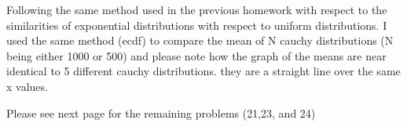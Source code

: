 \documentclass{article}\usepackage[]{graphicx}\usepackage[]{color}
\begin{document}
Following the same method used in the previous homework with respect to the similarities of exponential distributions with respect to uniform distributions. I used the same method (ecdf) to compare the mean of N cauchy distributions (N being either 1000 or 500) and please note how the graph of the means are near identical to 5 different cauchy distributions. they are a straight line over the same x values.


Please see next page for the remaining problems (21,23, and 24)
\end{document}
